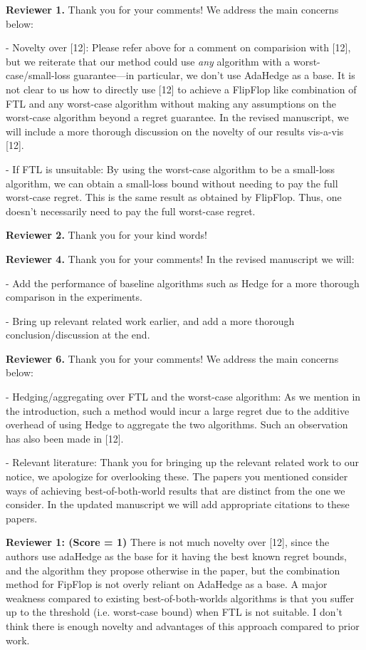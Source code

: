 \documentclass{article}
\begin{document}
{\bf Reviewer 1.} Thank you for your comments! We address the main concerns below:

- Novelty over [12]: Please refer above for a comment on comparision with [12], but we reiterate that our method could use \emph{any} algorithm with a worst-case/small-loss guarantee---in particular, we don't use AdaHedge as a base. It is not clear to us how to directly use [12] to achieve a FlipFlop like combination of FTL and any worst-case algorithm without making any assumptions on the worst-case algorithm beyond a regret guarantee. In the revised manuscript, we will include a more thorough discussion on the novelty of our results vis-a-vis [12].  

- If FTL is unsuitable: By using the worst-case algorithm to be a small-loss algorithm,  we can obtain a small-loss bound without needing to pay the full worst-case regret. This is the same result as obtained by FlipFlop. Thus, one doesn't necessarily need to pay the full worst-case regret. 

{\bf Reviewer 2.} Thank you for your kind words!

{\bf Reviewer 4.} Thank you for your comments! In the revised manuscript we will:

- Add the performance of baseline algorithms such as Hedge for a more thorough comparison in the experiments. 

- Bring up relevant related work earlier, and add a more thorough conclusion/discussion at the end. 

{\bf Reviewer 6.} Thank you for your comments! We address the main concerns below: 

- Hedging/aggregating over FTL and the worst-case algorithm: As we mention in the introduction, such a method would incur a large regret due to the additive overhead of using Hedge to aggregate the two algorithms. Such an observation has also been made in [12].  

- Relevant literature: Thank you for bringing up the relevant related work to our notice, we apologize for overlooking these. The papers you mentioned consider ways of achieving best-of-both-world results that are distinct from the one we consider. In the updated manuscript we will add appropriate citations to these papers.

\newpage

{\bf Reviewer 1: (Score = 1)} There is not much novelty over [12], since the authors use adaHedge as the base for it having the best known regret bounds, and the algorithm they propose otherwise in the paper, but the combination method for FipFlop is not overly reliant on AdaHedge as a base. A major weakness compared to existing best-of-both-worlds algorithms is that you suffer up to the threshold (i.e. worst-case bound) when FTL is not suitable. I don't think there is enough novelty and advantages of this approach compared to prior work. 
\end{document}
